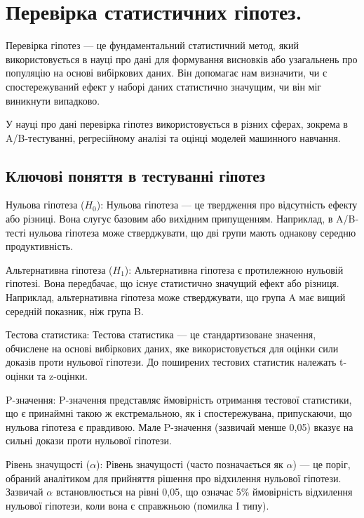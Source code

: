 \chapter{Перевірка статистичних гіпотез.}

Перевірка гіпотез — це фундаментальний статистичний метод, який використовується в науці про дані для формування висновків або узагальнень про популяцію на основі вибіркових даних. Він допомагає нам визначити, чи є спостережуваний ефект у наборі даних статистично значущим, чи він міг виникнути випадково.

У науці про дані перевірка гіпотез використовується в різних сферах, зокрема в A/B-тестуванні, регресійному аналізі та оцінці моделей машинного навчання.



\section{Ключові поняття в тестуванні гіпотез}

Нульова гіпотеза ($H_0$): Нульова гіпотеза — це твердження про відсутність ефекту або різниці. Вона слугує базовим або вихідним припущенням. Наприклад, в A/B-тесті нульова гіпотеза може стверджувати, що дві групи мають однакову середню продуктивність.

Альтернативна гіпотеза ($H_1$): Альтернативна гіпотеза є протилежною нульовій гіпотезі. Вона передбачає, що існує статистично значущий ефект або різниця. Наприклад, альтернативна гіпотеза може стверджувати, що група A має вищий середній показник, ніж група B.

Тестова статистика: Тестова статистика — це стандартизоване значення, обчислене на основі вибіркових даних, яке використовується для оцінки сили доказів проти нульової гіпотези. До поширених тестових статистик належать t-оцінки та z-оцінки.

P-значення: P-значення представляє ймовірність отримання тестової статистики, що є принаймні такою ж екстремальною, як і спостережувана, припускаючи, що нульова гіпотеза є правдивою. Мале P-значення (зазвичай менше 0,05) вказує на сильні докази проти нульової гіпотези.

Рівень значущості ($\alpha$): Рівень значущості (часто позначається як $\alpha$) — це поріг, обраний аналітиком для прийняття рішення про відхилення нульової гіпотези. Зазвичай $\alpha$ встановлюється на рівні 0,05, що означає 5$\%$ ймовірність відхилення нульової гіпотези, коли вона є справжньою (помилка I типу).

